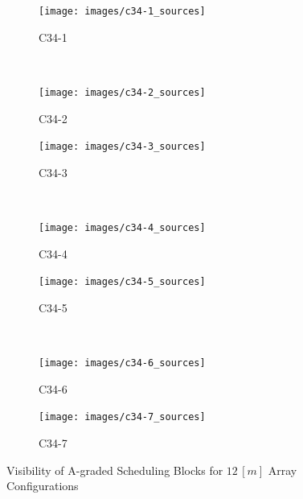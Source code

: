 \begin{figure}
        \centering
        \begin{subfigure}[b]{0.45\textwidth}
                \texttt{[image: images/c34-1\_sources]}
                \caption{C34-1} 
        \end{subfigure} 
        ~ %
%
        \begin{subfigure}[b]{0.45\textwidth}
                \texttt{[image: images/c34-2\_sources]}
                \caption{C34-2}
        \end{subfigure}

        \begin{subfigure}[b]{0.45\textwidth}
                \texttt{[image: images/c34-3\_sources]}
                \caption{C34-3}
        \end{subfigure}
        ~ 
        \begin{subfigure}[b]{0.45\textwidth}
                \texttt{[image: images/c34-4\_sources]}
                \caption{C34-4}
        \end{subfigure}%
        
        \begin{subfigure}[b]{0.45\textwidth}
                \texttt{[image: images/c34-5\_sources]}
                \caption{C34-5}
        \end{subfigure}
        ~
        \begin{subfigure}[b]{0.45\textwidth}
                \texttt{[image: images/c34-6\_sources]}
                \caption{C34-6}
        \end{subfigure}
        
        \begin{subfigure}[b]{0.45\textwidth}
                \texttt{[image: images/c34-7\_sources]}
                \caption{C34-7}
        \end{subfigure}           
        \caption{Visibility of A-graded Scheduling Blocks for $12\,[m]$ Array Configurations}
		\label{fig:results-sb-critical-set}
\end{figure}